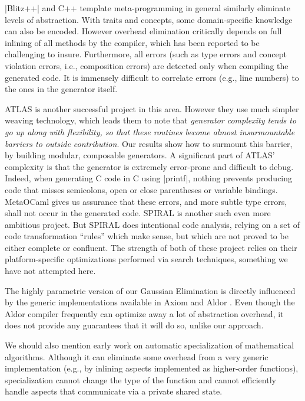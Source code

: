 \documentclass[draft]{elsart}
\begin{document}
|Blitz++| \cite{Veldhuizen:1998:ISCOPE} and {C++} template
meta-programming in general similarly eliminate levels
of abstraction.  With traits and concepts, some domain-specific
knowledge can also be encoded.  However overhead elimination
critically depends on full inlining of all methods by the compiler,
which has been reported to be challenging to insure. Furthermore, all
errors (such as type errors and concept violation errors, i.e.,
composition errors) are detected only when compiling the generated
code. It is immensely difficult to correlate errors (e.g., line
numbers) to the ones in the generator itself.

ATLAS \cite{ATLAS} is another successful project in this area.
However they use much simpler weaving technology, which leads them to
note that \emph{generator complexity tends to go up along with
  flexibility, so that these routines become almost insurmountable
  barriers to outside contribution}. Our results show how to surmount
this barrier, by building modular, composable generators. A
significant part of ATLAS' complexity is that the generator is
extremely error-prone and difficult to debug.  Indeed, when generating
C code in C using |printf|, nothing prevents producing code that
misses semicolons, open or close parentheses or variable
bindings. MetaOCaml gives us assurance that these errors, and more
subtle type errors, shall not occur in the generated code.  SPIRAL
\cite{Pueschel:05} is another such even more ambitious project.  But
SPIRAL does intentional code analysis, relying on a set of code
transformation ``rules'' which make sense, but which are not proved to
be either complete or confluent.  The strength of both of these
project relies on their platform-specific optimizations performed via
search techniques, something we have not attempted here.

The highly parametric version of our Gaussian Elimination is directly
influenced by the generic implementations available in Axiom
\cite{Axiom} and Aldor \cite{Watt:2002:HCA}.  Even though the Aldor
compiler frequently can optimize away a lot of abstraction overhead, 
it does not provide any guarantees that it will do so, unlike our
approach.

We should also mention early work \cite{Gluck95} on automatic
specialization of mathematical algorithms. Although it can eliminate
some overhead from a very generic implementation (e.g., by inlining
aspects implemented as higher-order functions), specialization cannot
change the type of the function and cannot efficiently handle aspects
that communicate via a private shared state.
\end{document}
